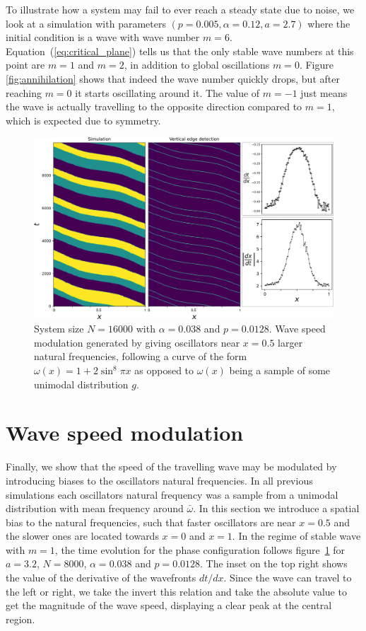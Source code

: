 To illustrate how a system may fail to ever reach a steady state due to noise, we look at a simulation with parameters $(p=0.005,
\alpha=0.12, a=2.7)$ where the initial condition is a wave with wave number $m=6$. Equation~(\ref{eq:critical_plane}) tells us that the
only stable wave numbers at this point are $m=1$ and $m=2$, in addition to global oscillations $m=0$. Figure \ref{fig:annihilation}
shows that indeed the wave number quickly drops, but after reaching $m=0$ it starts oscillating around it. The value of $m=-1$ just
means the wave is actually travelling to the opposite direction compared to $m=1$, which is expected due to symmetry.

\begin{figure}
  \centering
  \includegraphics[width=\textwidth]{fig/chap4/speed_modulation.png}
  \caption{
		System size $N=16000$ with $\alpha=0.038$ and $p=0.0128$. Wave speed modulation generated by giving oscillators near $x=0.5$ larger
		natural frequencies, following a curve of the form $\omega(x) = 1 + 2\sin^8 \pi x$ as opposed to $\omega(x)$ being a sample of some
		unimodal distribution $g$.
  }
  \label{fig:speedmodulation}
\end{figure}

\section{Wave speed modulation}

Finally, we show that the speed of the travelling wave may be modulated by introducing biases to the oscillators natural frequencies.
In all previous simulations each oscillators natural frequency was a sample from a unimodal distribution with mean frequency around
$\bar{\omega}$. In this section we introduce a spatial bias to the natural frequencies, such that faster oscillators are near $x=0.5$
and the slower ones are located towards $x=0$ and $x=1$. In the regime of stable wave with $m=1$, the time evolution for the phase
configuration follows figure~\ref{fig:speedmodulation} for $a=3.2$, $N=8000$, $\alpha=0.038$ and $p=0.0128$. The inset on the top right
shows the value of the derivative of the wavefronts $dt/dx$. Since the wave can travel to the left or right, we take the invert this
relation and take the absolute value to get the magnitude of the wave speed, displaying a clear peak at the central region.

